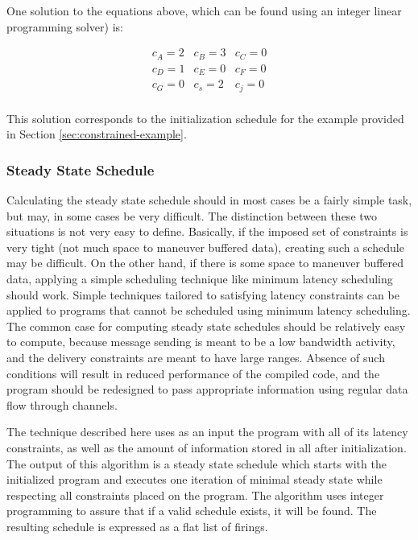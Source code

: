 One solution to the equations above, which can be found using an
integer linear programming solver) is:

\begin{displaymath}
\begin{array}{ccc}
c_A = 2 & c_B = 3 & c_C = 0 \\
c_D = 1 & c_E = 0 & c_F = 0 \\
c_G = 0 & c_s = 2 & c_j = 0 \\
\end{array}
\end{displaymath}

This solution corresponds to the initialization schedule for the
example provided in Section \ref{sec:constrained-example}.

\subsubsection{Steady State Schedule}

Calculating the steady state schedule should in most cases be a
fairly simple task, but may, in some cases be very difficult. The
distinction between these two situations is not very easy to
define.  Basically, if the imposed set of constraints is very
tight (not much space to maneuver buffered data), creating such a
schedule may be difficult.  On the other hand, if there is some
space to maneuver buffered data, applying a simple scheduling
technique like minimum latency scheduling should work.  Simple
techniques tailored to satisfying latency constraints can be
applied to programs that cannot be scheduled using minimum latency
scheduling.  The common case for computing steady state schedules
should be relatively easy to compute, because message sending is
meant to be a low bandwidth activity, and the delivery constraints
are meant to have large ranges. Absence of such conditions will
result in reduced performance of the compiled code, and the
program should be redesigned to pass appropriate information using
regular data flow through channels.

The technique described here uses as an input the {\StreamIt}
program with all of its latency constraints, as well as the amount
of information stored in all {\Channels} after initialization. The
output of this algorithm is a steady state schedule which starts
with the initialized program and executes one iteration of minimal
steady state while respecting all constraints placed on the
program. The algorithm uses integer programming to assure that if
a valid schedule exists, it will be found.  The resulting schedule
is expressed as a flat list of {\filter} firings.

